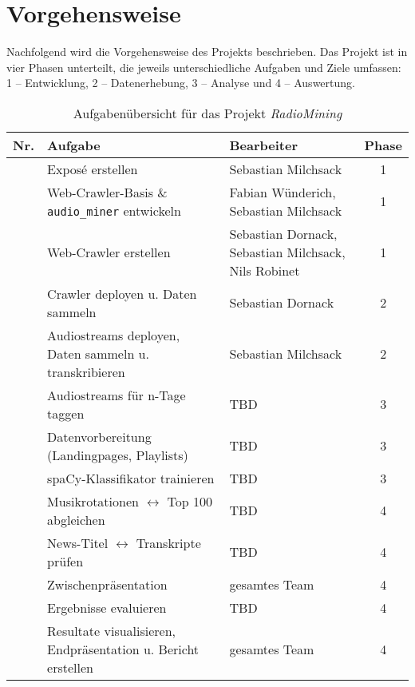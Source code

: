 \documentclass[ngerman,a4paper,11pt,parskip=half]{scrartcl}
\begin{document}
\section*{Vorgehensweise}
Nachfolgend wird die Vorgehensweise des Projekts beschrieben. Das Projekt ist in vier Phasen unterteilt, 
die jeweils unterschiedliche Aufgaben und Ziele umfassen: 1 – Entwicklung, 2 – Datenerhebung, 3 – Analyse 
und 4 – Auswertung.

\newcommand{\nr}{\stepcounter{task}\arabic{task}}

\begin{table}[h]
  \small
  \centering
  \caption{Aufgabenübersicht für das Projekt \textit{RadioMining}}
  \begin{tabular}{@{}cp{6.8cm}p{3.7cm}c@{}}
    \toprule
    \textbf{Nr.} & \textbf{Aufgabe} & \textbf{Bearbeiter} & \textbf{Phase} \\ \midrule
    \nr  & Exposé erstellen                                               & Sebastian Milchsack                                     & 1 \\
    \nr  & Web-Crawler-Basis \& \texttt{audio\_miner} entwickeln          & Fabian Wünderich, Sebastian Milchsack                   & 1 \\
    \nr  & Web-Crawler erstellen                                          & Sebastian Dornack, Sebastian Milchsack, Nils Robinet    & 1 \\
    \nr  & Crawler deployen u. Daten sammeln                              & Sebastian Dornack                                       & 2 \\
    \nr  & Audiostreams deployen, Daten sammeln u. transkribieren         & Sebastian Milchsack                                     & 2 \\
    \nr  & Audiostreams für n-Tage taggen                                 & TBD                                                     & 3 \\
    \nr  & Datenvorbereitung (Landingpages, Playlists)                    & TBD                                                     & 3 \\
    \nr  & spaCy-Klassifikator trainieren                                 & TBD                                                     & 3 \\
    \nr  & Musikrotationen $\leftrightarrow$ Top 100 abgleichen           & TBD                                                     & 4 \\
    \nr  & News-Titel $\leftrightarrow$ Transkripte prüfen                & TBD                                                     & 4 \\
    \nr  & Zwischenpräsentation                                           & gesamtes Team                                           & 4 \\
    \nr  & Ergebnisse evaluieren                                          & TBD                                                     & 4 \\
    \nr  & Resultate visualisieren, Endpräsentation u. Bericht erstellen  & gesamtes Team                                           & 4 \\ 
    \bottomrule
  \end{tabular}
\end{table}
\end{document}
